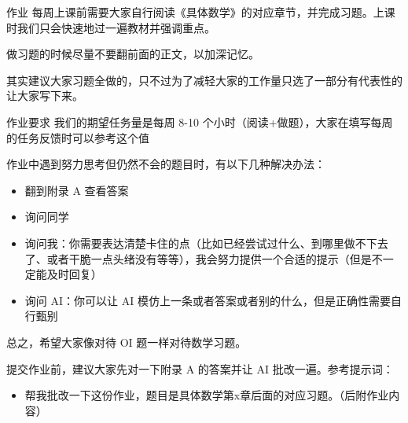 \begin{frame}{作业}
    每周上课前需要大家自行阅读《具体数学》的对应章节，并完成习题。上课时我们只会快速地过一遍教材并强调重点。

    做习题的时候尽量不要翻前面的正文，以加深记忆。

    其实建议大家习题全做的，只不过为了减轻大家的工作量只选了一部分有代表性的让大家写下来。
\end{frame}
\begin{frame}{作业要求}
    我们的期望任务量是每周 8-10 个小时（阅读+做题），大家在填写每周的任务反馈时可以参考这个值

    作业中遇到努力思考但仍然不会的题目时，有以下几种解决办法：
    \begin{itemize}
        \item 翻到附录 A 查看答案
        \item 询问同学
        \item 询问我：你需要表达清楚卡住的点（比如已经尝试过什么、到哪里做不下去了、或者干脆一点头绪没有等等），我会努力提供一个合适的提示（但是不一定能及时回复）
        \item 询问 AI：你可以让 AI 模仿上一条或者答案或者别的什么，但是正确性需要自行甄别
    \end{itemize}
    总之，希望大家像对待 OI 题一样对待数学习题。

    提交作业前，建议大家先对一下附录 A 的答案并让 AI 批改一遍。参考提示词：
    \begin{itemize}
        \item 帮我批改一下这份作业，题目是具体数学第x章后面的对应习题。（后附作业内容）
    \end{itemize}
\end{frame}